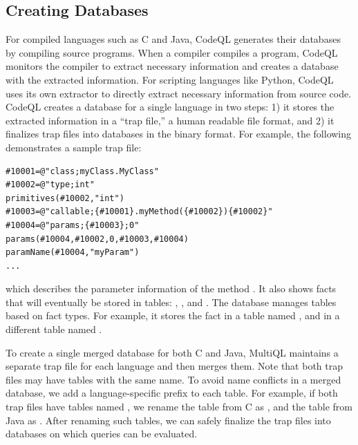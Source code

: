 \subsection{Creating Databases}
For compiled languages such as C and Java, CodeQL generates their databases by
compiling source programs.  When a compiler compiles a program, CodeQL monitors
the compiler to extract necessary information and creates a database with the
extracted information. For scripting languages like Python, CodeQL uses its own
extractor to directly extract necessary information from source code.
CodeQL creates a database for a single language in two steps:
1) it stores the extracted information in a ``trap
file,'' a human readable file format, and 2) it finalizes trap files
into databases in the binary format. For example, the
following demonstrates a sample trap file:

\begin{lstlisting}[style=java,numbers=none]
#10001=@"class;myClass.MyClass"
#10002=@"type;int"
primitives(#10002,"int")
#10003=@"callable;{#10001}.myMethod({#10002}){#10002}"
#10004=@"params;{#10003};0"
params(#10004,#10002,0,#10003,#10004)
paramName(#10004,"myParam")
...
\end{lstlisting}

\noindent
which describes the parameter information of the method .
It also shows facts that will eventually be stored in tables:
, , and
.
The database manages tables based on fact types. For example, it stores
the fact  in a table named , and
 in a different table named .


To create a single merged database for both C and Java, MultiQL maintains a
separate trap file for each language and then merges them.  
Note that both trap files may have tables with the same name.  
To avoid name conflicts in a merged database, we add a language-specific prefix
to each table.  
For example, if both trap files have tables named , we rename
the table from C as , and the table from Java as
.
After renaming such tables, we can safely finalize the trap files into
databases on which queries can be evaluated.

